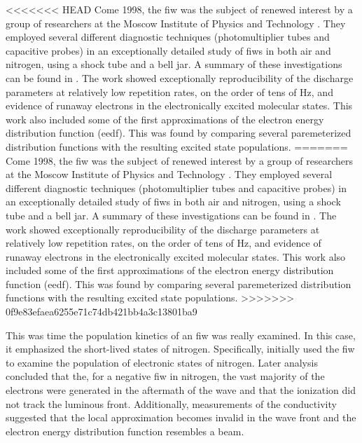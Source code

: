 <<<<<<< HEAD
Come 1998, the fiw was the subject of renewed interest by a group of
researchers at the Moscow Institute of Physics and Technology
\cite{Anikin1998}. They employed several different diagnostic techniques
(photomultiplier tubes and capacitive probes) in an exceptionally
detailed study of fiws in both air and nitrogen, using a shock tube and
a bell jar. A summary of these investigations can be found in
\cite{Starikovskaia2001}. The work showed exceptionally reproducibility
of the discharge parameters at relatively low repetition rates, on the
order of tens of Hz, and evidence of runaway electrons in the
electronically excited molecular states. This work also included some of
the first approximations of the electron energy distribution function
(\acs{eedf}). This was found by comparing several paremeterized
distribution functions with the resulting excited state populations.
=======
Come 1998, the fiw was the subject of renewed interest by a group of researchers
at the Moscow Institute of Physics and Technology \cite{Anikin1998}. They
employed several different diagnostic techniques (photomultiplier tubes and
capacitive probes) in an exceptionally detailed study of fiws in both air and
nitrogen, using a shock tube and a bell jar. A summary of these investigations
can be found in \cite{Starikovskaia2001}. The work showed exceptionally
reproducibility of the discharge parameters at relatively low repetition rates,
on the order of tens of Hz, and evidence of runaway electrons in the
electronically excited molecular states. This work also included some of the
first approximations of the electron energy distribution function (\acs{eedf}).
This was found by comparing several paremeterized distribution functions with
the resulting excited state populations. 
>>>>>>> 0f9e83efaea6255e71c74db421bb4a3c13801ba9

This was time the population kinetics of an fiw was really examined. In this
case, it emphasized the short-lived states of nitrogen. Specifically,
\cite{Pancheshnyi1998} initially used the fiw to examine the population
of electronic states of nitrogen. Later analysis \cite{Pancheshnyi1999}
concluded that the, for a negative fiw in nitrogen, the vast majority of
the electrons were generated in the aftermath of the wave and that the
ionization did not track the luminous front. Additionally, measurements
of the conductivity suggested that the local approximation becomes
invalid in the wave front and the electron energy distribution function
resembles a beam.

